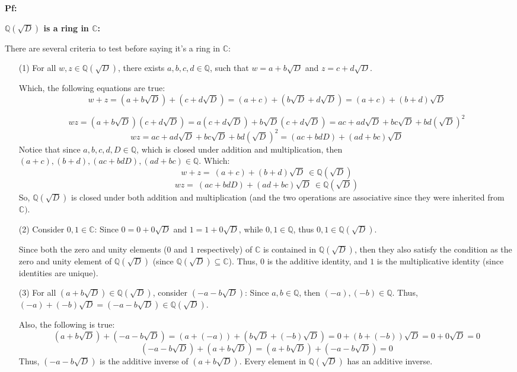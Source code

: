 \documentclass{article}
\begin{document}
\textbf{Pf:}

\textbf{$\mathbb{Q}(\sqrt{D})$ is a ring in $\mathbb{C}$:}

There are several criteria to test before saying it's a ring in $\mathbb{C}$:
\begin{itemize}
    \item[(1)] For all $w,z\in \mathbb{Q}(\sqrt{D})$,
    there exists $a,b,c,d \in \mathbb{Q}$, such that $w=a+b\sqrt{D}$ and $z=c+d\sqrt{D}$.

    Which, the following equations are true:
    $$w+z=(a+b\sqrt{D})+(c+d\sqrt{D})=(a+c)+(b\sqrt{D}+d\sqrt{D}) = (a+c)+(b+d)\sqrt{D}$$

    $$wz = (a+b\sqrt{D})(c+d\sqrt{D})=a(c+d\sqrt{D})+b\sqrt{D}(c+d\sqrt{D}) = ac+ad\sqrt{D} + bc\sqrt{D}+bd(\sqrt{D})^2$$
    $$wz= ac+ad\sqrt{D} + bc\sqrt{D}+bd(\sqrt{D})^2 = (ac+bdD)+(ad+bc)\sqrt{D}$$
    Notice that since $a,b,c,d,D\in\mathbb{Q}$, which is closed under addition and multiplication, then $(a+c),(b+d),(ac+bdD),(ad+bc)\in\mathbb{Q}$.
    Which:
    $$w+z=\ (a+c)+(b+d)\sqrt{D}\  \in \mathbb{Q}(\sqrt{D})$$ 
    $$wz =\ (ac+bdD)+(ad+bc)\sqrt{D}\ \in \mathbb{Q}(\sqrt{D})$$
    So, $\mathbb{Q}(\sqrt{D})$ is closed under both addition and multiplication (and the two operations are associative since they were inherited from $\mathbb{C})$.
    
    \hfill

    \item[(2)] Consider $0,1\in\mathbb{C}$: Since $0 = 0+0\sqrt{D}$ and $1=1+0\sqrt{D}$, while $0,1\in\mathbb{Q}$, thus $0,1\in \mathbb{Q}(\sqrt{D})$.

    Since both the zero and unity elements ($0$ and $1$ respectively) of $\mathbb{C}$ is contained in $\mathbb{Q}(\sqrt{D})$, 
    then they also satisfy the condition as the zero and unity element of $\mathbb{Q}(\sqrt{D})$ (since $\mathbb{Q}(\sqrt{D})\subseteq \mathbb{C}$).
    Thus, $0$ is the additive identity, and $1$ is the multiplicative identity (since identities are unique).

    \hfill

    \item[(3)] For all $(a+b\sqrt{D})\in\mathbb{Q}(\sqrt{D})$, consider $(-a-b\sqrt{D})$:
    Since $a,b\in\mathbb{Q}$, then $(-a),(-b)\in\mathbb{Q}$. Thus, $(-a)+(-b)\sqrt{D}=(-a-b\sqrt{D})\in\mathbb{Q}(\sqrt{D})$.

    Also, the following is true:
    $$(a+b\sqrt{D}) + (-a-b\sqrt{D}) = (a+(-a))+(b\sqrt{D}+(-b)\sqrt{D}) = 0+(b+(-b))\sqrt{D} = 0+0\sqrt{D} = 0$$
    $$(-a-b\sqrt{D})+(a+b\sqrt{D}) =(a+b\sqrt{D}) + (-a-b\sqrt{D}) =0$$
    Thus, $(-a-b\sqrt{D})$ is the additive inverse of $(a+b\sqrt{D})$. Every element in $\mathbb{Q}(\sqrt{D})$ has an additive inverse.


\end{itemize}
\end{document}
